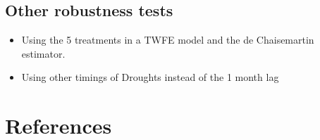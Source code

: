 \documentclass[12pt, oneside]{article}      %
\begin{document}
\subsection{Other robustness tests}

\begin{itemize}
    \item Using the 5 treatments in a TWFE model and the de Chaisemartin estimator.
    \item Using other timings of Droughts instead of the 1 month lag
\end{itemize}






\newpage
\clearpage
 
\section*{References}
\nocite{*}
\begingroup
\singlespacing
\renewcommand{\section}[2]{}%
\begin{spacing}{2}

\end{spacing}
\endgroup
\clearpage



\appendix
\clearpage
\newpage
\section*{Appendix}
\setcounter{figure}{0} \renewcommand{\thefigure}{A.\arabic{figure}}
\setcounter{table}{0} \renewcommand{\thetable}{A.\arabic{table}}
\end{document}
